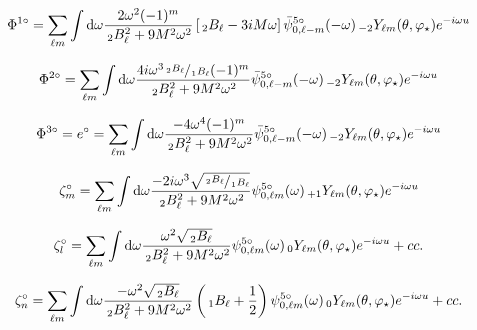 \begin{equation}
\Phi^{1 \circ} = \sum_{\ell m} \int \textrm{d} \omega \frac{ 2 \omega^2 (-1)^m}{\,{}_{2}B^2_\ell + 9 M^2 \omega^2} \left[ \,{}_{2}B_\ell - 3iM \omega \right] \bar{\psi}^{5 \circ}_{0, \ell -m}(- \omega) \,{}_{-2}Y_{\ell m} (\theta, \varphi_\star) e^{-i \omega u}
\end{equation}

\begin{equation}
\Phi^{2 \circ} = \sum_{\ell m} \int \textrm{d} \omega \frac{ 4 i \omega^3 \sfrac{\,{}_{2}B_\ell}{\,{}_{1}B_\ell} (-1)^m}{\,{}_{2}B^2_\ell + 9 M^2 \omega^2} \bar{\psi}^{5 \circ}_{0, \ell -m}(- \omega) \,{}_{-2}Y_{\ell m} (\theta, \varphi_\star) e^{-i \omega u}
\end{equation}

\begin{equation}
\Phi^{3 \circ} = e^\circ = \sum_{\ell m} \int \textrm{d} \omega \frac{-4 \omega^4 (-1)^m}{\,{}_{2}B^2_\ell + 9 M^2 \omega^2} \bar{\psi}^{5 \circ}_{0, \ell -m}(-\omega) \,{}_{-2}Y_{\ell m} (\theta, \varphi_\star) e^{-i \omega u}
\end{equation}

\begin{equation}
\zeta^\circ_m = \sum_{\ell m} \int \textrm{d} \omega \frac{-2 i \omega^3 \sqrt{\sfrac{\,{}_{2}B_\ell}{\,{}_{1}B_\ell}}}{\,{}_{2}B^2_\ell + 9 M^2 \omega^2} \psi^{5 \circ}_{0, \ell m}(\omega) \,{}_{+1}Y_{\ell m} (\theta, \varphi_\star) e^{-i \omega u}
\end{equation}

\begin{equation}
\zeta^\circ_l = \sum_{\ell m} \int \textrm{d} \omega \frac{\omega^2 \sqrt{\,{}_{2}B_\ell}}{\,{}_{2}B^2_\ell + 9 M^2 \omega^2} \psi^{5 \circ}_{0, \ell m}(\omega) \,{}_{0}Y_{\ell m} (\theta, \varphi_\star) e^{-i \omega u} + cc.
\end{equation}

\begin{equation}
\zeta^\circ_n = \sum_{\ell m} \int \textrm{d} \omega \frac{-\omega^2 \sqrt{\,{}_{2}B_\ell}}{\,{}_{2}B^2_\ell + 9 M^2 \omega^2} \left( \,{}_{1}B_\ell + \frac{1}{2} \right)\psi^{5 \circ}_{0, \ell m}(\omega) \,{}_{0}Y_{\ell m} (\theta, \varphi_\star) e^{-i \omega u} + cc.
\end{equation}